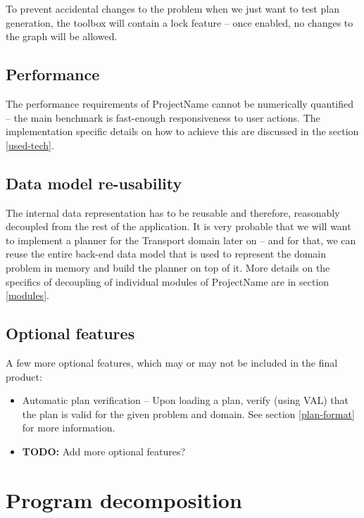 \documentclass[10pt,a4paper,oneside]{article}
\newcommand{\TODO}[1]{{\textbf{TODO:} #1}} %
\newcommand{\pname}{ProjectName} %
\begin{document}
To prevent accidental changes to the problem when we just want to test plan generation,
the toolbox will contain a lock feature -- once enabled, no changes to the graph will be allowed.

\subsection{Performance}

The performance requirements of \pname{} cannot be numerically quantified -- the main benchmark is fast-enough
responsiveness to user actions. The implementation specific details on how to achieve this are discussed in the section \ref{used-tech}.

\subsection{Data model re-usability}

The internal data representation has to be reusable and therefore, reasonably decoupled from the rest of the application.
It is very probable that we will want to implement a planner for the Transport domain later on
-- and for that, we can reuse the entire back-end data model that is used to represent the domain problem in memory
and build the planner on top of it.
More details on the specifics of decoupling of individual modules of \pname{} are in section \ref{modules}.

\subsection{Optional features}

A few more optional features, which may or may not be included in the final product:

\begin{itemize}
\item Automatic plan verification -- Upon loading a plan, verify (using VAL) that the plan is valid for the given problem and domain. See section \ref{plan-format} for more information.
\item \TODO Add more optional features?
\end{itemize}









\section{Program decomposition}
\end{document}
